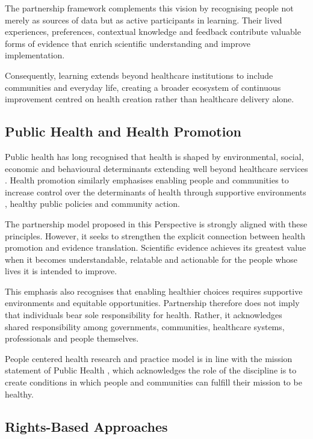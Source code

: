 \documentclass{article}
\begin{document}
The partnership framework complements this vision by recognising people not merely as sources of data but as active participants in learning. Their lived experiences, preferences, contextual knowledge and feedback contribute valuable forms of evidence that enrich scientific understanding and improve implementation.

Consequently, learning extends beyond healthcare institutions to include communities and everyday life, creating a broader ecosystem of continuous improvement centred on health creation rather than healthcare delivery alone.
\subsection{Public Health and Health Promotion}
\label{sec:orgf80da9b}

Public health has long recognised that health is shaped by environmental, social, economic and behavioural determinants extending well beyond healthcare services \cite{WHO1986} \cite{Marmot2012}. Health promotion similarly emphasises enabling people and communities to increase control over the determinants of health through supportive environments \cite{WHO1986}, healthy public policies and community action.

The partnership model proposed in this Perspective is strongly aligned with these principles. However, it seeks to strengthen the explicit connection between health promotion and evidence translation. Scientific evidence achieves its greatest value when it becomes understandable, relatable and actionable \cite{Nutbeam2000} for the people whose lives it is intended to improve.

This emphasis also recognises that enabling healthier choices requires supportive environments and equitable opportunities. Partnership therefore does not imply that individuals bear sole responsibility for health. Rather, it acknowledges shared responsibility among governments, communities, healthcare systems, professionals and people themselves.

People centered health research and practice model is in line with the mission statement of Public Health \cite{IOM1988}, which acknowledges the role of the discipline is to create conditions \cite{IOM1988} in which people and communities can fulfill their mission to be healthy.
\subsection{Rights-Based Approaches}
\label{sec:org5f900a6}
\end{document}
